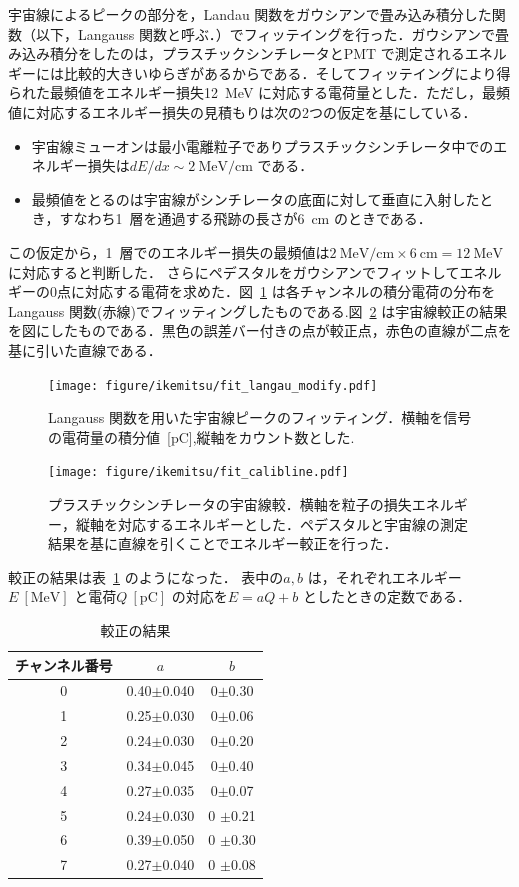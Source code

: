 宇宙線によるピークの部分を，Landau 関数をガウシアンで畳み込み積分した関数（以下，Langauss 関数と呼ぶ．）でフィッテイングを行った．ガウシアンで畳み込み積分をしたのは，プラスチックシンチレータとPMT で測定されるエネルギーには比較的大きいゆらぎがあるからである．そしてフィッテイングにより得られた最頻値をエネルギー損失12~MeV に対応する電荷量とした．ただし，最頻値に対応するエネルギー損失の見積もりは次の2つの仮定を基にしている．
\begin{itemize}
\item 宇宙線ミューオンは最小電離粒子でありプラスチックシンチレータ中でのエネルギー損失は$dE/dx \sim 2~\mathrm{MeV/cm}$ である．
\item 最頻値をとるのは宇宙線がシンチレータの底面に対して垂直に入射したとき，すなわち1~層を通過する飛跡の長さが6~cm のときである．
\end{itemize}
この仮定から，1~層でのエネルギー損失の最頻値は$2~\mathrm{MeV/cm} \times 6~\mathrm{cm} = 12~\mathrm{MeV}$ に対応すると判断した\cite{leo}．
さらにペデスタルをガウシアンでフィットしてエネルギーの0点に対応する電荷を求めた．図~\ref{ps_langau} は各チャンネルの積分電荷の分布をLangauss 関数(赤線)でフィッティングしたものである.図~\ref{ps_cali} は宇宙線較正の結果を図にしたものである．黒色の誤差バー付きの点が較正点，赤色の直線が二点を基に引いた直線である．

\begin{figure}[H]
\centering
\texttt{[image: figure/ikemitsu/fit\_langau\_modify.pdf]}
\caption{Langauss 関数を用いた宇宙線ピークのフィッティング．横軸を信号の電荷量の積分値~[pC],縦軸をカウント数とした. }
\label{ps_langau}
\end{figure} 
\begin{figure}[H]
\centering
\texttt{[image: figure/ikemitsu/fit\_calibline.pdf]}
\caption{プラスチックシンチレータの宇宙線較．横軸を粒子の損失エネルギー，縦軸を対応するエネルギーとした．ペデスタルと宇宙線の測定結果を基に直線を引くことでエネルギー較正を行った．}\label{ps_cali}
\end{figure}

較正の結果は表~\ref{PS_calib_table} のようになった．
表中の$a, b$ は，それぞれエネルギー$E~[\mathrm{MeV }]$ と電荷$Q~[\mathrm{pC}]$ の対応を$E = a Q + b$ としたときの定数である．
\begin{table}[h]
\caption{較正の結果}
\label{PS_calib_table}
\centering
\begin{tabular}{ccc}\toprule
チャンネル番号 & $a$ & $b$ \\ \midrule
0 & 0.40$\pm$0.040 & 0$\pm$0.30 \\
1 & 0.25$\pm$0.030 & 0$\pm$0.06 \\
2 & 0.24$\pm$0.030 & 0$\pm$0.20 \\
3 & 0.34$\pm$0.045 & 0$\pm$0.40 \\
4 & 0.27$\pm$0.035 & 0$\pm$0.07 \\
5 & 0.24$\pm$0.030 &0 $\pm$0.21 \\
6 & 0.39$\pm$0.050 &0 $\pm$0.30 \\
7 & 0.27$\pm$0.040 &0 $\pm$0.08 \\ \bottomrule
\end{tabular}
\end{table}%

